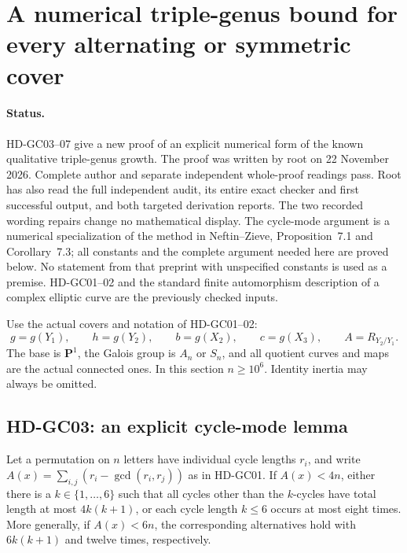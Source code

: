 \section{A numerical triple-genus bound for every alternating or symmetric cover}
\label{sec:effective-triple-genus}

\paragraph{Status.}
HD-GC03--07 give a new proof of an explicit numerical form of the
known qualitative triple-genus growth. The proof was written by root
on 22 November 2026. Complete author and separate independent whole-proof readings pass. Root has also read the full independent audit, its entire exact checker and first successful output, and both targeted derivation reports. The two recorded wording repairs change no mathematical display.
The cycle-mode argument is a numerical specialization of the method
in Neftin--Zieve, Proposition~7.1 and Corollary~7.3; all constants
and the complete argument needed here are proved below. No statement
from that preprint with unspecified constants is used as a premise.
HD-GC01--02 and the standard finite automorphism description of a
complex elliptic curve are the previously checked inputs.

Use the actual covers and notation of HD-GC01--02:
\[
 g=g(Y_1),\qquad h=g(Y_2),\qquad b=g(X_2),\qquad c=g(X_3),
 \qquad A=R_{Y_2/Y_1}.
\]
The base is $\mathbf P^1$, the Galois group is $A_n$ or $S_n$, and
all quotient curves and maps are the actual connected ones. In this
section $n\geq10^6$. Identity inertia may always be omitted.

\subsection*{HD-GC03: an explicit cycle-mode lemma}

Let a permutation on $n$ letters have individual cycle lengths $r_i$,
and write $A(x)=\sum_{i,j}(r_i-\gcd(r_i,r_j))$ as in HD-GC01.
If $A(x)<4n$, either there is a $k\in\{1,\ldots,6\}$ such that
all cycles other than the $k$-cycles have total length at most
$4k(k+1)$, or each cycle length $k\leq6$ occurs at most eight times.
More generally, if $A(x)<6n$, the corresponding alternatives hold
with $6k(k+1)$ and twelve times, respectively.

